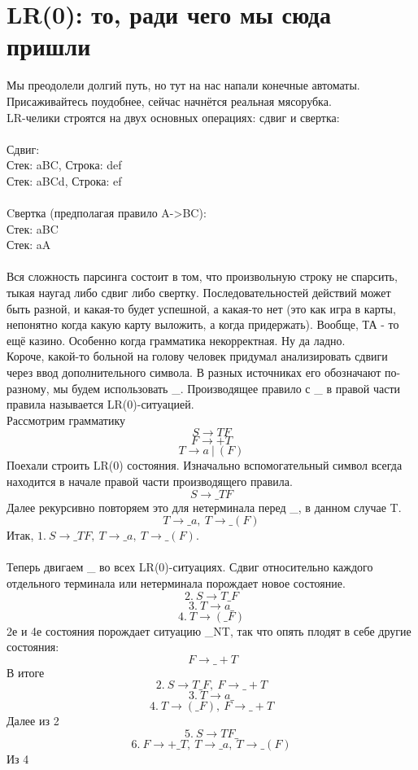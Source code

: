 \documentclass{article}
\begin{document}
\part{LR(0): то, ради чего мы сюда пришли}
Мы преодолели долгий путь, но тут на нас напали конечные автоматы. 
Присаживайтесь поудобнее, сейчас начнётся реальная мясорубка.\\
LR-челики строятся на двух основных операциях: сдвиг и свертка:\\\\
Сдвиг:\\
Стек: aBC, Строка: def\\
Стек: aBCd, Строка: ef\\
\\
Cвертка (предполагая правило A->BC):\\
Стек: aBC\\
Стек: aA\\
\\
Вся сложность парсинга состоит в том, что произвольную строку не спарсить, 
тыкая наугад либо сдвиг либо свертку. Последовательностей действий 
может быть разной, и какая-то будет успешной, а какая-то нет (это как 
игра в карты, непонятно когда какую карту выложить, а когда придержать). 
Вообще, ТА - то ещё казино. Особенно когда грамматика некорректная.
Ну да ладно.\\
Короче, какой-то больной на голову человек придумал анализировать сдвиги
через ввод дополнительного символа. В разных источниках его обозначают
по-разному, мы будем использовать \_. Производящее правило 
с \_ в правой части правила называется LR(0)-ситуацией.\\
Рассмотрим грамматику
$$S\to TF$$
$$F\to +T$$
$$T\to a \ | \ (F)$$
Поехали строить LR(0) состояния. Изначально вспомогательный символ 
всегда находится в начале правой части производящего правила.
$$S\to \_TF$$
Далее рекурсивно повторяем это для нетерминала перед \_, в данном случае T.
$$T\to \_a, \ T\to \_(F)$$
Итак, $1. \ S\to \_TF, \ T\to \_a, \ T\to \_(F)$.\\\\
Теперь двигаем \_ во всех LR(0)-ситуациях. Сдвиг относительно 
каждого отдельного терминала или нетерминала порождает новое состояние.
$$2. \ S\to T\_F$$
$$3. \ T\to a\_$$
$$4. \ T\to (\_F)$$
2е и 4е состояния порождает ситуацию \_NT, так что опять плодят в себе
другие состояния:
$$\ F\to \_+T$$
В итоге
$$2. \ S\to T\_F, \ F\to \_+T$$
$$3. \ T\to a\_$$
$$4. \ T\to (\_F), \ F\to \_+T$$
Далее из 2
$$5. \ S\to TF\_$$
$$6. \ F\to +\_T, \ T\to \_a, \ T\to \_(F)$$
Из 4
\end{document}

